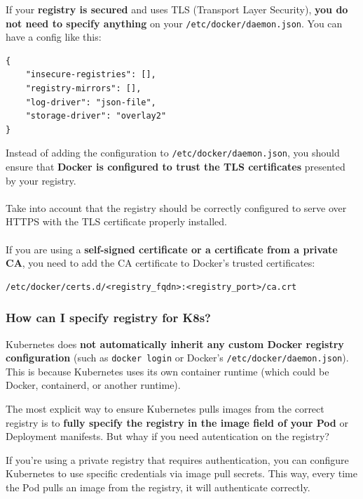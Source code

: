 \documentclass{article}
\newenvironment{blocktemplate}[1]{%
    \tcolorbox[beamer,%
    noparskip,breakable,
    colframe=Blue,%
    colbacklower=LimeGreen!75!LightGreen,%
    title=#1]}%
    {\endtcolorbox}
\newenvironment{codetemplate}[1][]{%
  \mybasecolorbox[#1]
  \itshape
}{%
  \endmybasecolorbox
}
\begin{document}
\begin{blocktemplate}{NOTE 2}
If your \textbf{registry is secured} and uses TLS (Transport Layer Security), \textbf{you do not need to specify anything} on your \verb|/etc/docker/daemon.json|. You can have a config like this:
\begin{codetemplate}{}
\begin{verbatim}
{
    "insecure-registries": [],
    "registry-mirrors": [],
    "log-driver": "json-file",
    "storage-driver": "overlay2"
}
\end{verbatim}
\end{codetemplate}
Instead of adding the configuration to \verb|/etc/docker/daemon.json|, you should ensure that \textbf{Docker is configured to trust the TLS certificates} presented by your registry.
\\\\
Take into account that the registry should be correctly configured to serve over HTTPS with the TLS certificate properly installed. 
\\\\
If you are using a \textbf{self-signed certificate or a certificate from a private CA}, you need to add the CA certificate to Docker's trusted certificates:
\begin{codetemplate}{}
\begin{verbatim}
/etc/docker/certs.d/<registry_fqdn>:<registry_port>/ca.crt
\end{verbatim}
\end{codetemplate}
\end{blocktemplate}

\subsubsection{How can I specify registry for K8s?}
Kubernetes does \textbf{not automatically inherit any custom Docker registry configuration} (such as \verb|docker login| or Docker's \verb|/etc/docker/daemon.json|). This is because Kubernetes uses its own container runtime (which could be Docker, containerd, or another runtime).

The most explicit way to ensure Kubernetes pulls images from the correct registry is to \textbf{fully specify the registry in the image field of your Pod} or Deployment manifests. But whay if you need autentication on the registry?

If you're using a private registry that requires authentication, you can configure Kubernetes to use specific credentials via image pull secrets. This way, every time the Pod pulls an image from the registry, it will authenticate correctly.
\end{document}
